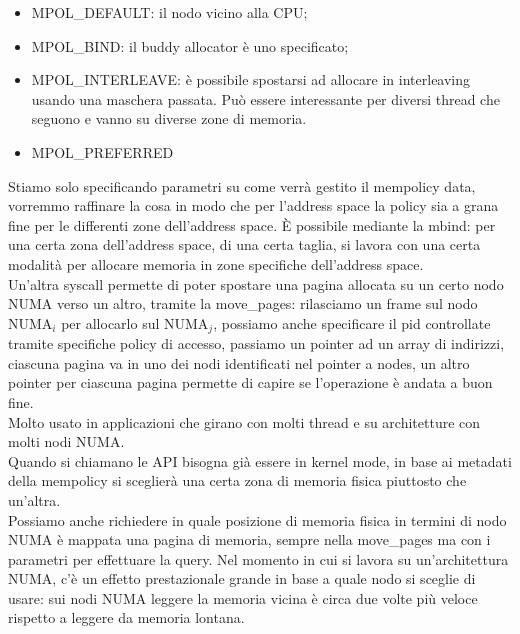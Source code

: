 \documentclass[12pt, oneside]{extbook}
\begin{document}
\begin{itemize}
\item MPOL\_DEFAULT: il nodo vicino alla CPU;
\item MPOL\_BIND: il buddy allocator è uno specificato;
\item MPOL\_INTERLEAVE: è possibile spostarsi ad allocare in interleaving usando una maschera passata. Può essere interessante per diversi thread che seguono e vanno su diverse zone di memoria.
\item MPOL\_PREFERRED
\end{itemize}
Stiamo solo specificando parametri su come verrà gestito il mempolicy data, vorremmo raffinare la cosa in modo che per l'address space la policy sia a grana fine per le differenti zone dell'address space. È possibile mediante la \textsf{mbind}: per una certa zona dell'address space, di una certa taglia, si lavora con una certa modalità per allocare memoria in zone specifiche dell'address space.\\ Un'altra syscall permette di poter spostare una pagina allocata su un certo nodo NUMA verso un altro, tramite la \textsf{move\_pages}: rilasciamo un frame sul nodo NUMA$_i$ per allocarlo sul NUMA$_j$, possiamo anche specificare il pid controllate tramite specifiche policy di accesso, passiamo un pointer ad un array di indirizzi, ciascuna pagina va in uno dei nodi identificati nel pointer a nodes, un altro pointer per ciascuna pagina permette di capire se l'operazione è andata a buon fine.\\ Molto usato in applicazioni che girano con molti thread e su architetture con molti nodi NUMA.\\
Quando si chiamano le API bisogna già essere in kernel mode, in base ai metadati della mempolicy si sceglierà una certa zona di memoria fisica piuttosto che un'altra.\\ Possiamo anche richiedere in quale posizione di memoria fisica in termini di nodo NUMA è mappata una pagina di memoria, sempre nella \textsf{move\_pages} ma con i parametri per effettuare la query. Nel momento in cui si lavora su un'architettura NUMA, c'è un effetto prestazionale grande in base a quale nodo si sceglie di usare: sui nodi NUMA leggere la memoria vicina è circa due volte più veloce rispetto a leggere da memoria lontana.
\end{document}
